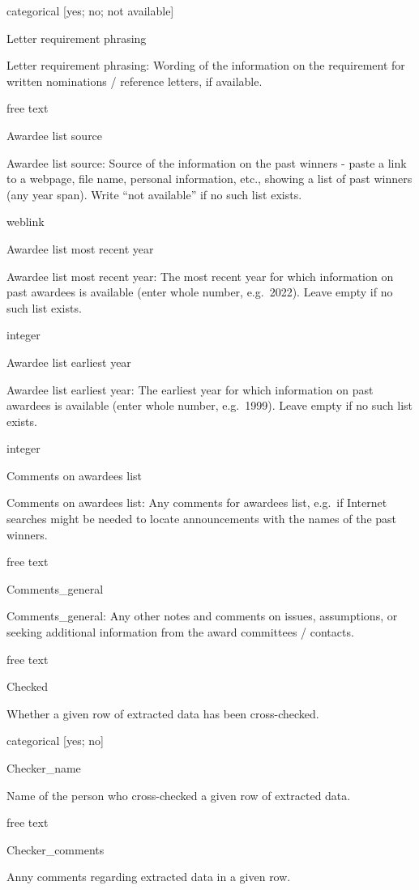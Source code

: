 \documentclass[
]{article}
\begin{document}
categorical {[}yes; no; not available{]}

Letter requirement phrasing

Letter requirement phrasing: Wording of the information on the
requirement for written nominations / reference letters, if available.

free text

Awardee list source

Awardee list source: Source of the information on the past winners -
paste a link to a webpage, file name, personal information, etc.,
showing a list of past winners (any year span). Write ``not available''
if no such list exists.

weblink

Awardee list most recent year

Awardee list most recent year: The most recent year for which
information on past awardees is available (enter whole number,
e.g.~2022). Leave empty if no such list exists.

integer

Awardee list earliest year

Awardee list earliest year: The earliest year for which information on
past awardees is available (enter whole number, e.g.~1999). Leave empty
if no such list exists.

integer

Comments on awardees list

Comments on awardees list: Any comments for awardees list, e.g.~if
Internet searches might be needed to locate announcements with the names
of the past winners.

free text

Comments\_general

Comments\_general: Any other notes and comments on issues, assumptions,
or seeking additional information from the award committees / contacts.

free text

Checked

Whether a given row of extracted data has been cross-checked.

categorical {[}yes; no{]}

Checker\_name

Name of the person who cross-checked a given row of extracted data.

free text

Checker\_comments

Anny comments regarding extracted data in a given row.
\end{document}
